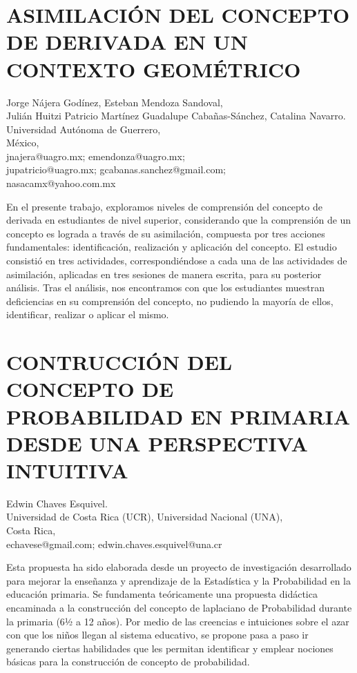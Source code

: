 \section{ASIMILACIÓN DEL CONCEPTO DE DERIVADA EN UN CONTEXTO GEOMÉTRICO }

\begin{datos}
Jorge Nájera Godínez, Esteban Mendoza Sandoval, \\  Julián Huitzi Patricio Martínez Guadalupe Cabañas-Sánchez, Catalina Navarro. \\
 Universidad Autónoma de Guerrero,  \\
\hfill México, \\
\hfill jnajera@uagro.mx; emendonza@uagro.mx; \\ \hfill jupatricio@uagro.mx; gcabanas.sanchez@gmail.com;  \\ \hfill nasacamx@yahoo.com.mx
\end{datos}

En el presente trabajo, exploramos niveles de comprensión del concepto
de derivada en estudiantes de nivel superior, considerando que la
comprensión de un concepto es lograda a través de su asimilación,
compuesta por tres acciones fundamentales: identificación, realización
y aplicación del concepto. El estudio consistió en tres actividades,
correspondiéndose a cada una de las actividades de asimilación, aplicadas
en tres sesiones de manera escrita, para su posterior análisis. Tras
el análisis, nos encontramos con que los estudiantes muestran deficiencias
en su comprensión del concepto, no pudiendo la mayoría de ellos, identificar,
realizar o aplicar el mismo.


\section{CONTRUCCIÓN DEL CONCEPTO DE PROBABILIDAD EN PRIMARIA DESDE UNA PERSPECTIVA
INTUITIVA}

\begin{datos}
Edwin Chaves Esquivel. \\
 Universidad de Costa Rica (UCR), Universidad Nacional (UNA),  \\
\hfill Costa Rica, \\
\hfill echavese@gmail.com; edwin.chaves.esquivel@una.cr 
\end{datos}

Esta propuesta ha sido elaborada desde un proyecto de investigación
desarrollado para mejorar la enseñanza y aprendizaje de la Estadística
y la Probabilidad en la educación primaria. Se fundamenta teóricamente
una propuesta didáctica encaminada a la construcción del concepto
de laplaciano de Probabilidad durante la primaria (6½ a 12 años).
Por medio de las creencias e intuiciones sobre el azar con que los
niños llegan al sistema educativo, se propone pasa a paso ir generando
ciertas habilidades que les permitan identificar y emplear nociones
básicas para la construcción de concepto de probabilidad. 


